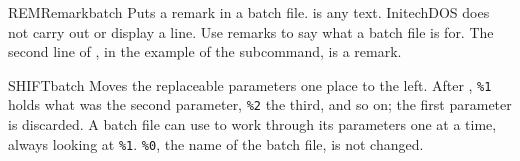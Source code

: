 \begin{DosEntry}{REM}{Remark}{batch}
\Purpose Puts a remark in a batch file.
\Format {}
\Remarks
{} is any text.  InitechDOS does not carry out or display a
 line.  Use remarks to say what a batch file is for.
\Example
The second line of , in the example of the 
subcommand, is a remark.
\end{DosEntry}

\begin{DosEntry}{SHIFT}{}{batch}
\Purpose Moves the replaceable parameters one place to the left.
\Format {}
\Remarks
After , \texttt{\%1} holds what was the second parameter,
\texttt{\%2} the third, and so on; the first parameter is discarded.  A
batch file can use  to work through its parameters one at a
time, always looking at \texttt{\%1}.  \texttt{\%0}, the name of the batch file, is not changed.
\Example
{}
\end{DosEntry}
